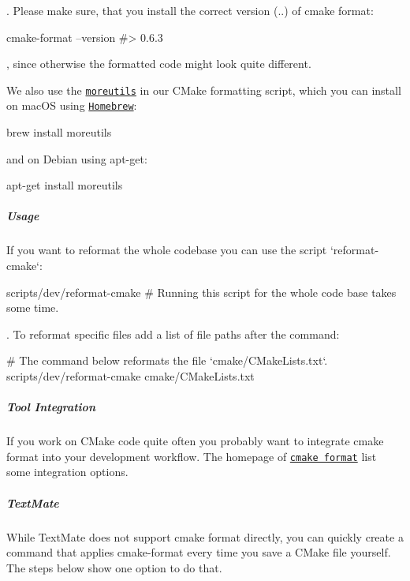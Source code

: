 . Please make sure, that you install the correct version ({..}) of cmake format\+:


\begin{DoxyCode}
cmake-format --version
#> 0.6.3
\end{DoxyCode}


, since otherwise the formatted code might look quite different.

We also use the \href{https://joeyh.name/code/moreutils}{\tt moreutils} in our C\+Make formatting script, which you can install on mac\+OS using \href{https://brew.sh}{\tt Homebrew}\+:


\begin{DoxyCode}
brew install moreutils
\end{DoxyCode}


and on Debian using {\ttfamily apt-\/get}\+:


\begin{DoxyCode}
apt-get install moreutils
\end{DoxyCode}


\label{invalid_invalid}%
%
\subparagraph*{Usage}

If you want to reformat the whole codebase you can use the script `reformat-\/cmake`\+:


\begin{DoxyCode}
scripts/dev/reformat-cmake # Running this script for the whole code base takes some time.
\end{DoxyCode}


. To reformat specific files add a list of file paths after the command\+:


\begin{DoxyCode}
# The command below reformats the file `cmake/CMakeLists.txt`.
scripts/dev/reformat-cmake cmake/CMakeLists.txt
\end{DoxyCode}


\label{invalid_invalid}%
%
\subparagraph*{Tool Integration}

If you work on C\+Make code quite often you probably want to integrate cmake format into your development workflow. The homepage of \href{https://github.com/cheshirekow/cmake_format#integrations}{\tt cmake format} list some integration options.

\subparagraph*{Text\+Mate}

While Text\+Mate does not support cmake format directly, you can quickly create a command that applies {\ttfamily cmake-\/format} every time you save a C\+Make file yourself. The steps below show one option to do that.


